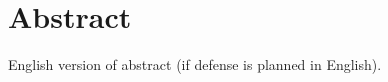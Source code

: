 \chapter*{Abstract}                         
English version of abstract (if defense is planned in English).